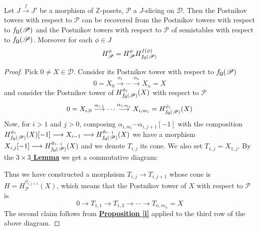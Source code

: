 \begin{prop}\label{t}
Let $J \overset{f}{\longrightarrow} J'$ be a morphism of $\mathbb{Z}$-posets, $\mathscr{P}$ a $J$-slicing on $\mathscr{D}$. Then the Postnikov towers with respect to $\mathscr{P}$ can be recovered from the Postnikov towers with respect to $f_{\textnormal{\Libra}}(\mathscr{P})$ and the Postnikov towers with respect to $\mathscr{P}$ of semistables with respect to $f_{\textnormal{\Libra}}(\mathscr{P})$. Moreover for each $\phi \in J$  $$H^{\phi}_{\mathscr{P}} = H^{\phi}_{\mathscr{P}}H^{f(\phi)}_{f_{\textnormal{\Libra}}(\mathscr{P})}$$
\end{prop}

\begin{proof}
Pick $0 \not = X \in \mathscr{D}$. Consider its Postnikov tower with respect to $f_{\textnormal{\Libra}}(\mathscr{P})$ $$0=X_0 \overset{\alpha_1}{\longrightarrow} \cdots \overset{\alpha_n}{\longrightarrow} X_n=X$$ and consider the Postnikov tower of $H^{\phi_i}_{f_{\textnormal{\Libra}}(\mathscr{P})}(X)$ with respect to $\mathscr{P}$ $$0=X_{i,0} \overset{\alpha_{i,1}}{\longrightarrow} \cdots \overset{\alpha_{i,m_i}}{\longrightarrow} X_{i,m_i}=H^{\phi_i}_{f_{\textnormal{\Libra}}(\mathscr{P})}(X)$$
Now, for $i>1$ and $j>0$, composing $\alpha_{i,m_i} \cdots \alpha_{i,j+1}[-1]$ with the composition $H^{\phi_i}_{f_{\textnormal{\Libra}}(\mathscr{P})}(X)[-1] \longrightarrow X_{i-1} \longrightarrow H^{\phi_{i-1}}_{f_{\textnormal{\Libra}}(\mathscr{P})}(X)$  we have a morphism $X_{i,j}[-1] \longrightarrow H^{\phi_{i-1}}_{f_{\textnormal{\Libra}}(\mathscr{P})}(X)$ and we denote $T_{i,j}$ its cone. We also set $T_{1,j}=X_{1,j}$. By the \hyperref[s]{\textbf{$3 \times 3$ Lemma}} we get a commutative diagram: 
\begin{center}
\end{center}
Thus we have constructed a morphsism $T_{i,j} \longrightarrow T_{i,j+1}$ whose cone is $H=H^{\phi_{i,j+1}}_{\mathscr{P}}(X)$, which means that the Postnikov tower of $X$ with respect to $\mathscr{P}$ is $$0 \longrightarrow T_{1,1} \longrightarrow T_{1,2} \longrightarrow \cdots \longrightarrow T_{n,m_n}=X$$
The second claim follows from  \hyperref[i]{\textbf{Proposition \ref*{i}}} applied to the third row of the above diagram. 
\end{proof}

